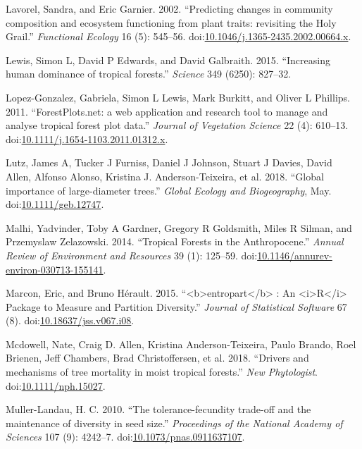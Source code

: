 \documentclass[]{elsarticle} %
\begin{document}
\hypertarget{ref-Lavorel2002}{}
Lavorel, Sandra, and Eric Garnier. 2002. ``Predicting changes in
community composition and ecosystem functioning from plant traits:
revisiting the Holy Grail.'' \emph{Functional Ecology} 16 (5): 545--56.
doi:\href{https://doi.org/10.1046/j.1365-2435.2002.00664.x}{10.1046/j.1365-2435.2002.00664.x}.

\hypertarget{ref-Lewis2015}{}
Lewis, Simon L, David P Edwards, and David Galbraith. 2015. ``Increasing
human dominance of tropical forests.'' \emph{Science} 349 (6250):
827--32.

\hypertarget{ref-Lopez-Gonzalez2011}{}
Lopez-Gonzalez, Gabriela, Simon L Lewis, Mark Burkitt, and Oliver L
Phillips. 2011. ``ForestPlots.net: a web application and research tool
to manage and analyse tropical forest plot data.'' \emph{Journal of
Vegetation Science} 22 (4): 610--13.
doi:\href{https://doi.org/10.1111/j.1654-1103.2011.01312.x}{10.1111/j.1654-1103.2011.01312.x}.

\hypertarget{ref-Lutz2018}{}
Lutz, James A, Tucker J Furniss, Daniel J Johnson, Stuart J Davies,
David Allen, Alfonso Alonso, Kristina J. Anderson-Teixeira, et al. 2018.
``Global importance of large-diameter trees.'' \emph{Global Ecology and
Biogeography}, May.
doi:\href{https://doi.org/10.1111/geb.12747}{10.1111/geb.12747}.

\hypertarget{ref-Malhi2014}{}
Malhi, Yadvinder, Toby A Gardner, Gregory R Goldsmith, Miles R Silman,
and Przemyslaw Zelazowski. 2014. ``Tropical Forests in the
Anthropocene.'' \emph{Annual Review of Environment and Resources} 39
(1): 125--59.
doi:\href{https://doi.org/10.1146/annurev-environ-030713-155141}{10.1146/annurev-environ-030713-155141}.

\hypertarget{ref-Marcon2015}{}
Marcon, Eric, and Bruno Hérault. 2015.
``\textless{}b\textgreater{}entropart\textless{}/b\textgreater{} : An
\textless{}i\textgreater{}R\textless{}/i\textgreater{} Package to
Measure and Partition Diversity.'' \emph{Journal of Statistical
Software} 67 (8).
doi:\href{https://doi.org/10.18637/jss.v067.i08}{10.18637/jss.v067.i08}.

\hypertarget{ref-Mcdowell2018}{}
Mcdowell, Nate, Craig D. Allen, Kristina Anderson-Teixeira, Paulo
Brando, Roel Brienen, Jeff Chambers, Brad Christoffersen, et al. 2018.
``Drivers and mechanisms of tree mortality in moist tropical forests.''
\emph{New Phytologist}.
doi:\href{https://doi.org/10.1111/nph.15027}{10.1111/nph.15027}.

\hypertarget{ref-Muller-Landau2010}{}
Muller-Landau, H. C. 2010. ``The tolerance-fecundity trade-off and the
maintenance of diversity in seed size.'' \emph{Proceedings of the
National Academy of Sciences} 107 (9): 4242--7.
doi:\href{https://doi.org/10.1073/pnas.0911637107}{10.1073/pnas.0911637107}.
\end{document}
